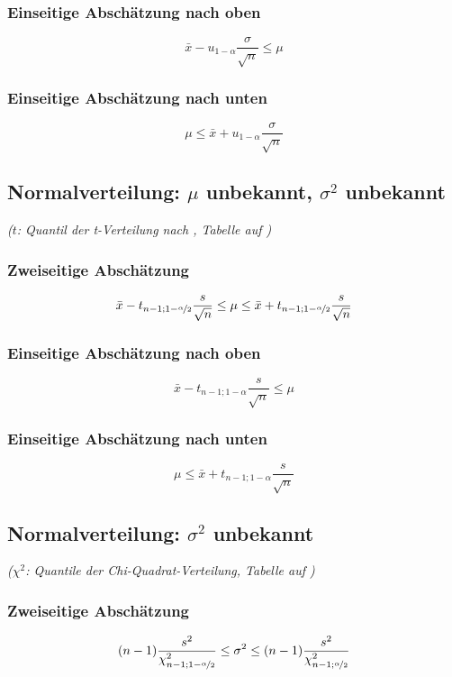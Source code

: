 \subsubsection*{Einseitige Abschätzung nach oben}
\[ \bar{x}-u_{1-\alpha}\frac{\sigma}{\sqrt{n}}\leq\mu \]

\subsubsection*{Einseitige Abschätzung nach unten}
\[ \mu\leq\bar{x}+u_{1-\alpha}\frac{\sigma}{\sqrt{n}} \]

\subsection*{Normalverteilung: $\mu$ unbekannt, $\sigma^{2}$ unbekannt}
\emph{($t$: Quantil der t-Verteilung nach , Tabelle auf )}

\subsubsection*{Zweiseitige Abschätzung}
\[ \bar{x}-t_{n-1;1-\nicefrac{\alpha}{2}}\frac{s}{\sqrt{n}}\leq\mu\leq\bar{x}+t_{n-1;1-\nicefrac{\alpha}{2}}\frac{s}{\sqrt{n}} \]

\subsubsection*{Einseitige Abschätzung nach oben}
\[ \bar{x}-t_{n-1;1-\alpha}\frac{s}{\sqrt{n}}\leq\mu \]

\subsubsection*{Einseitige Abschätzung nach unten}
\[ \mu\leq\bar{x}+t_{n-1;1-\alpha}\frac{s}{\sqrt{n}} \]

\subsection*{Normalverteilung: $\sigma^{2}$ unbekannt}
\emph{($\chi^{2}$: Quantile der Chi-Quadrat-Verteilung, Tabelle auf )}

\subsubsection*{Zweiseitige Abschätzung}
\[ (n-1)\frac{s^{2}}{\chi_{n-1;1-\nicefrac{\alpha}{2}}^{2}}\leq\sigma^{2}\leq(n-1)\frac{s^{2}}{\chi_{n-1;\nicefrac{\alpha}{2}}^{2}} \]

